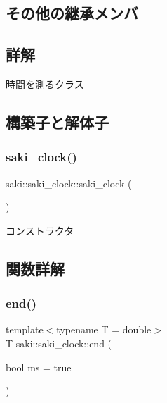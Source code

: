 \subsection*{その他の継承メンバ}


\subsection{詳解}
時間を測るクラス 

\subsection{構築子と解体子}
\mbox{\label{classsaki_1_1saki__clock_adbee591f08017ecdf70147070df6d778}} 
\subsubsection{\texorpdfstring{saki\+\_\+clock()}{saki\_clock()}}
{\footnotesize\ttfamily saki\+::saki\+\_\+clock\+::saki\+\_\+clock (\begin{DoxyParamCaption}{ }\end{DoxyParamCaption})\hspace{0.3cm}{\ttfamily [inline]}}



コンストラクタ 



\subsection{関数詳解}
\mbox{\label{classsaki_1_1saki__clock_aa255b4d6478090b4ef19a844dd824d06}} 
\subsubsection{\texorpdfstring{end()}{end()}}
{\footnotesize\ttfamily template$<$typename T  = double$>$ \\
T saki\+::saki\+\_\+clock\+::end (\begin{DoxyParamCaption}\item[{bool}]{ms = {\ttfamily true} }\end{DoxyParamCaption})\hspace{0.3cm}{\ttfamily [inline]}}




